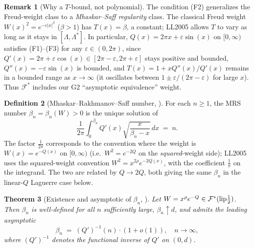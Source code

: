 \documentclass[11pt]{article}
\newtheorem{theorem}{Theorem}
\theoremstyle{definition}
\newtheorem{definition}[theorem]{Definition}
\newtheorem{remark}[theorem]{Remark}
\begin{document}
\begin{remark}[Why a $T$-bound, not polynomial]\label{rem:Tbound}
The condition (F2) generalizes the Freud-weight class to a
\emph{Mhaskar--Saff regularity} class.  The classical Freud weight
$W(x)^2=e^{-c|x|^\beta}$ ($\beta>1$) has $T(x)=\beta$, a constant; LL2005
allows $T$ to vary as long as it stays in $[\Lambda,\Lambda^*]$.  In
particular, $Q(x)=2\pi x+\varepsilon\sin(x)$ on $[0,\infty)$ satisfies (F1)--(F3)
for any $\varepsilon\in(0,2\pi)$, since
$Q'(x)=2\pi+\varepsilon\cos(x)\in[2\pi-\varepsilon,2\pi+\varepsilon]$ stays positive and bounded,
$Q''(x)=-\varepsilon\sin(x)$ is bounded, and $T(x)=1+xQ''(x)/Q'(x)$ remains in
a bounded range as $x\to\infty$ (it oscillates between $1\pm\varepsilon/(2\pi-\varepsilon)$
for large $x$).  Thus $\mathcal{F}^*$ includes our G2 ``asymptotic
equivalence'' weight.
\end{remark}

\begin{definition}[Mhaskar--Rakhmanov--Saff number, {\cite[Eq.~(1.6)]{LL2005}}]
\label{def:MRS}
For each $n\ge 1$, the MRS number $\beta_n=\beta_n(W)>0$ is the unique
solution of
\begin{equation}\label{eq:MRSdef}
   \frac{1}{2\pi}\int_{0}^{\beta_n} Q'(x)\sqrt{\frac{x}{\beta_n-x}}\,dx \;=\; n.
\end{equation}
The factor $\frac{1}{2\pi}$ corresponds to the convention where the
weight is $W(x)=e^{-Q(x)}$ on $[0,\infty)$ (i.e.\ $W^2=e^{-2Q}$ on the
\emph{squared}-weight side); LL2005 uses the squared-weight convention
$W^2=x^{2\rho}e^{-2Q(x)}$, with the coefficient $\frac{1}{\pi}$ on the
integrand. The two are related by $Q\to 2Q$, both giving the same
$\beta_n$ in the linear-$Q$ Laguerre case below.
\end{definition}

\begin{theorem}[Existence and asymptotic of $\beta_n$, {\cite[Thm.~1.5]{LL2005}}]
\label{thm:LLbeta}
Let $W=x^\rho e^{-Q}\in\mathcal{F}^*(\textnormal{lip}\frac{1}{2})$.  Then
$\beta_n$ is well-defined for all $n$ sufficiently large, $\beta_n\uparrow d$,
and admits the leading asymptotic
\begin{equation}\label{eq:LLbetalead}
   \beta_n \;=\; (Q')^{-1}(n) \cdot (1+o(1)),\quad n\to\infty,
\end{equation}
where $(Q')^{-1}$ denotes the functional inverse of $Q'$ on $(0,d)$.
\end{theorem}
\end{document}
